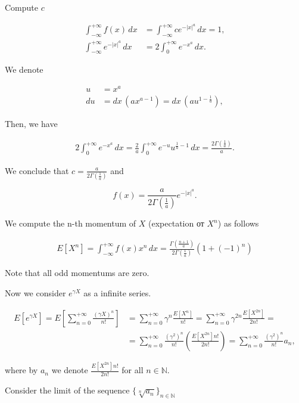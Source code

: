 \documentclass[12pt, a4paper]{article}
\theoremstyle{remark}
\theoremstyle{definition}
\newcommand{\expx}[1]{e^{-|x|^{#1}}}
\newcommand{\expxpoz}[1]{e^{-x^{#1}}}
\newcommand{\infint}[1]{\int_{-\infty}^{+\infty} #1 \, dx}
\newcommand{\infintpoz}[1]{\int_{0}^{+\infty} #1 \, dx}
\begin{document}
Compute $c$

\begin{align*}
    \infint{f(x)} & = \infint{c\expx{a}} = 1, \\
    \infint{\expx{a}} & = 2\infintpoz{\expxpoz{a}}.
\end{align*}

We denote

\begin{align*}
    u  & = x^a                                              \\
    du & = dx\,(a x^{a - 1}) = dx\,(a u^{1 - \frac{1}{a}}),
\end{align*}

Then, we have

\begin{align*}
    2\infintpoz{\expxpoz{a}} = \frac{2}{a} \infintpoz{e^{-u}u^{\frac{1}{a} - 1}} = \frac{2\Gamma(\frac{1}{a})}{a}.
\end{align*}

We conclude that $c = \frac{a}{2\Gamma(\frac{1}{a})}
$ and

$$f(x) = \frac{a}{2\Gamma(\frac{1}{a})} \expx{a}.$$

We compute the n-th momentum of $X$ (expectation от $X^n$) as follows

\begin{align*}
    E[X^n] = \infint{f(x) x^n} = \frac{\Gamma(\frac{n + 1}{a})}{2\Gamma(\frac{1}{a})} (1 + (-1)^n)
\end{align*}

Note that all odd momentums are zero. 

Now we consider $e^{\gamma X}$ as a infinite series.

\begin{align*}
    E[e^{\gamma X}] = E\left[\sum_{n = 0}^{+\infty}\frac{(\gamma X)^n}{n!}\right] & = \sum_{n = 0}^{+\infty}\gamma^n\frac{E[X^n]}{n!} = \sum_{n = 0}^{+\infty}\gamma^{2n}\frac{E[X^{2n}]}{2n!} =                                \\
    & = \sum_{n = 0}^{+\infty}\frac{(\gamma^2)^{n}}{n!}\left(\frac{E[X^{2n}]n!}{2n!}\right) = \sum_{n = 0}^{+\infty}\frac{(\gamma^2)^{n}}{n!} a_n,
\end{align*}

where by $a_n$ we denote $\frac{E[X^{2n}]n!}{2n!}$ for all $n \in \mathbb{N}$.

Consider the limit of the sequence $\{\sqrt[n]{a_n}\}_{n \in \mathbb{N}}$
\end{document}
